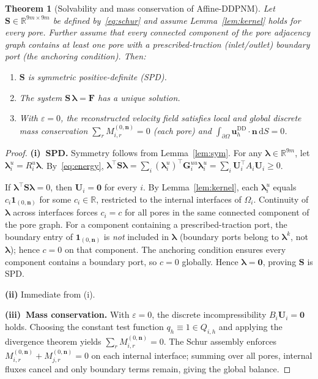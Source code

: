 \documentclass[11pt,a4paper]{article}
\newtheorem{theorem}[lemma]{Theorem}
\newcommand{\R}{\mathbb{R}}
\newcommand{\dom}{\Omega}
\newcommand{\pore}[1]{\Omega_{#1}}
\newcommand{\vel}{\bm{u}}
\newcommand{\normal}{\bm{n}}
\newcommand{\trac}{\bm{\lambda}}
\newcommand{\DtN}{\mathbf{G}}
\newcommand{\Schur}{\mathbf{S}}
\newcommand{\one}{\mathbf{1}}
\newcommand{\respvel}{\mathbf{U}}
\begin{document}

\begin{theorem}[Solvability and mass conservation of Affine-DDPNM]
  \label{thm:main}
  Let $\Schur \in \R^{9m \times 9m}$ be defined by~\eqref{eq:schur}
  and assume Lemma~\ref{lem:kernel} holds for every pore.
  Further assume that every connected component of the pore adjacency
  graph contains at least one pore with a prescribed-traction
  (inlet/outlet) boundary port (the \emph{anchoring condition}).
  Then:
  \begin{enumerate}[label=(\roman*),nosep]
    \item $\Schur$ is symmetric positive-definite (SPD).
    \item The system $\Schur\,\trac = \bm{F}$ has a unique solution.
    \item With $\varepsilon = 0$, the reconstructed velocity field
      satisfies local and global discrete mass conservation
      $\sum_r M_{i,r}^{(0,\normal)} = 0$ (each pore) and
      $\int_{\partial\dom} \vel_h^{\text{DD}}\cdot\normal\,\mathrm{d}S=0$.
  \end{enumerate}
\end{theorem}

\begin{proof}
  \textbf{(i)~SPD.}  Symmetry follows from Lemma~\ref{lem:sym}.
  For any $\trac \in \R^{9m}$, let $\trac_i^u = R_i^u \trac$.
  By~\eqref{eq:energy},
  $\trac^\top \Schur \trac = \sum_i (\trac_i^u)^\top \DtN_i^{uu} \trac_i^u
   = \sum_i \respvel_i^\top A_i \respvel_i \ge 0$.

  If $\trac^\top \Schur \trac = 0$, then $\respvel_i = \bm{0}$ for every
  $i$.  By Lemma~\ref{lem:kernel}, each $\trac_i^u$ equals
  $c_i \one_{(0,\normal)}$ for some $c_i \in \R$, restricted to the
  internal interfaces of $\pore{i}$.  Continuity of $\trac$ across
  interfaces forces $c_i = c$ for all pores in the same connected component
  of the pore graph.  For a component containing a prescribed-traction port,
  the boundary entry of $\one_{(0,\normal)}$ is \emph{not} included in
  $\trac$ (boundary ports belong to $\trac^k$, not $\trac$); hence $c=0$
  on that component.  The anchoring condition ensures every component
  contains a boundary port, so $c=0$ globally.  Hence $\trac = \bm{0}$,
  proving $\Schur$ is SPD.

  \textbf{(ii)} Immediate from (i).

  \textbf{(iii)~Mass conservation.}  With $\varepsilon = 0$, the discrete
  incompressibility $B_i \respvel_i = \bm{0}$ holds.  Choosing the constant
  test function $q_h \equiv 1 \in Q_{i,h}$ and applying the divergence
  theorem yields $\sum_r M_{i,r}^{(0,\normal)} = 0$.  The Schur assembly
  enforces $M_{i,r}^{(0,\normal)} + M_{j,r}^{(0,\normal)} = 0$ on each
  internal interface; summing over all pores, internal fluxes cancel and
  only boundary terms remain, giving the global balance.
\end{proof}
\end{document}
